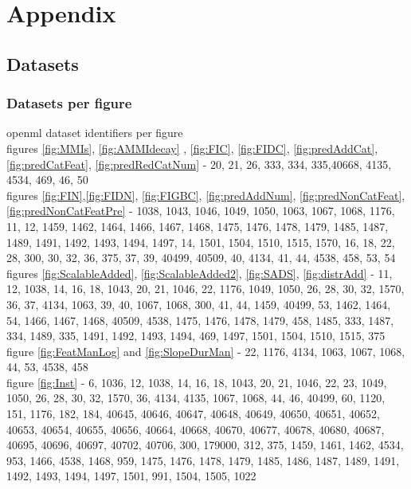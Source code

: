 \documentclass[a4paper,10pt]{article}
\begin{document}
\section{Appendix}
\subsection{Datasets}
\subsubsection{Datasets per figure}
openml dataset identifiers per figure \\

figures \ref{fig:MMIs}, \ref{fig:AMMIdecay} , \ref{fig:FIC}, \ref{fig:FIDC}, \ref{fig:predAddCat}, \ref{fig:predCatFeat}, \ref{fig:predRedCatNum}  - 20, 21, 26, 333, 334, 335,40668, 4135, 4534, 469, 46, 50 \\
figures \ref{fig:FIN},\ref{fig:FIDN}, \ref{fig:FIGBC}, \ref{fig:predAddNum}, \ref{fig:predNonCatFeat}, \ref{fig:predNonCatFeatPre} - 1038, 1043, 1046, 1049, 1050, 1063, 1067, 1068, 1176, 11, 12, 1459, 1462, 1464, 1466, 1467, 1468, 1475, 1476, 1478, 1479, 1485, 1487, 1489, 1491, 1492, 1493, 1494, 1497, 14, 1501, 1504, 1510, 1515, 1570, 16, 18, 22, 28, 300, 30, 32, 36, 375, 37, 39, 40499, 40509, 40, 4134, 41, 44, 4538, 458, 53, 54 \\
figures \ref{fig:ScalableAdded}, \ref{fig:ScalableAdded2}, \ref{fig:SADS}, \ref{fig:distrAdd} - 11, 12, 1038, 14, 16, 18, 1043, 20, 21, 1046, 22, 1176, 1049, 1050, 26, 28, 30, 32, 1570, 36, 37, 4134, 1063, 39, 40, 1067, 1068, 300, 41, 44, 1459, 40499, 53, 1462, 1464, 54, 1466, 1467, 1468, 40509, 4538, 1475, 1476, 1478, 1479, 458, 1485, 333, 1487, 334, 1489, 335, 1491, 1492, 1493, 1494, 469, 1497, 1501, 1504, 1510, 1515, 375 \\
figure \ref{fig:FeatManLog} and \ref{fig:SlopeDurMan}  - 22, 1176, 4134, 1063, 1067, 1068, 44, 53, 4538, 458 \\
figure \ref{fig:Inst} - 6, 1036, 12, 1038, 14, 16, 18, 1043, 20, 21, 1046, 22, 23, 1049, 1050, 26, 28, 30, 32, 1570, 36, 4134, 4135, 1067, 1068, 44, 46, 40499, 60, 1120, 151, 1176, 182, 184, 40645, 40646, 40647, 40648, 40649, 40650, 40651, 40652, 40653, 40654, 40655, 40656, 40664, 40668, 40670, 40677, 40678, 40680, 40687, 40695, 40696, 40697, 40702, 40706, 300, 179000, 312, 375, 1459, 1461, 1462, 4534, 953, 1466, 4538, 1468, 959, 1475, 1476, 1478, 1479, 1485, 1486, 1487, 1489, 1491, 1492, 1493, 1494, 1497, 1501, 991, 1504, 1505, 1022 \\
\end{document}
